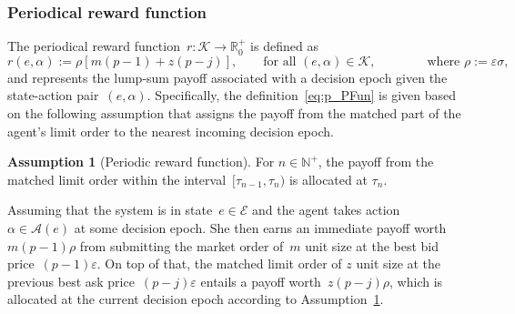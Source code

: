\documentclass{amsart}[11pt]
\numberwithin{equation}{section}
\theoremstyle{definition}
\newtheorem{assumption}[theorem]{Assumption}
\newcommand{\RR}{\mathbb{R}}
\newcommand{\NN}{\mathbb{N}}
\newcommand{\Kk}{\mathcal{K}}
\newcommand{\Ee}{\mathcal{E}}
\newcommand{\eps}{\varepsilon}
\newcommand{\Aa}{\mathcal{A}}
\begin{document}
\subsubsection{Periodical reward function}
The {periodical reward function}~$r: \Kk\to\RR^+_0$
is defined as
\begin{equation}\label{eq:p_PFun}
r(e, \alpha) :=\rho\left[m\left(p - 1\right) + z\left(p - j\right)\right],
\qquad\text{for all } (e, \alpha)\in \Kk,
\qquad\qquad\text{where }\rho := \eps \sigma,
\end{equation}
and represents the lump-sum payoff associated with a decision epoch
given the state-action pair~$(e, \alpha)$.
Specifically, 
the definition~\eqref{eq:p_PFun} is given based on 
the following assumption that assigns the payoff from the matched part of the agent's limit order to the nearest incoming decision epoch.
\begin{assumption}[Periodic reward function]\label{assumption:limitpayoffend}
For $n \in \NN^+$, the payoff from the matched limit order within the interval~$[\tau_{n-1}, \tau_{n})$ is allocated at $\tau_{n}$. 
\end{assumption}
Assuming that the system is in state~$e\in \Ee$ and the agent takes action~$\alpha\in\Aa(e)$ at some decision epoch.
She then earns an immediate payoff worth~$m(p - 1)\rho$ from submitting the market order of~$m$ unit size at the best bid price~$(p - 1)\eps$.
On top of that, the matched limit order of $z$ unit size at the previous best ask price~$(p- j)\eps$ entails a payoff worth~$z(p - j)\rho$,
which is allocated at the current decision epoch according to Assumption~\ref{assumption:limitpayoffend}.
\end{document}
